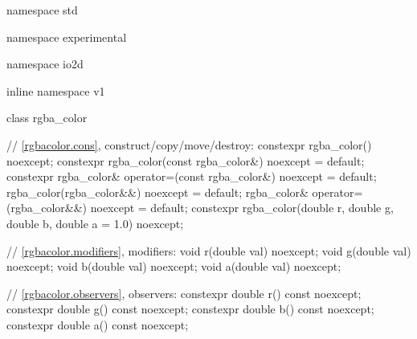 \begin{codeblock}
namespace std { namespace experimental { namespace io2d { inline namespace v1 {
  class rgba_color {
    // \ref{rgbacolor.cons}, construct/copy/move/destroy:
    constexpr rgba_color() noexcept;
    constexpr rgba_color(const rgba_color&) noexcept = default;
    constexpr rgba_color& operator=(const rgba_color&) noexcept = default;
    rgba_color(rgba_color&&) noexcept = default;
    rgba_color& operator=(rgba_color&&) noexcept = default;
    constexpr rgba_color(double r, double g, double b, double a = 1.0) noexcept;
  
    // \ref{rgbacolor.modifiers}, modifiers:
    void r(double val) noexcept;
    void g(double val) noexcept;
    void b(double val) noexcept;
    void a(double val) noexcept;
    
    // \ref{rgbacolor.observers}, observers:
    constexpr double r() const noexcept;
    constexpr double g() const noexcept;
    constexpr double b() const noexcept;
    constexpr double a() const noexcept;
    
}}}}}
\end{codeblock}
